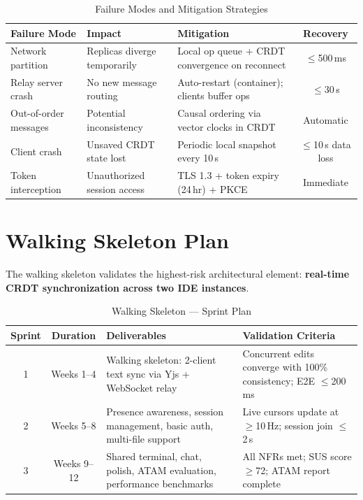 \documentclass[12pt, a4paper, oneside]{article}
\begin{document}
\begin{table}[H]
\centering
\caption{Failure Modes and Mitigation Strategies}
\begin{tabularx}{\textwidth}{l X X c}
\toprule
\textbf{Failure Mode} & \textbf{Impact} & \textbf{Mitigation} & \textbf{Recovery} \\
\midrule
Network partition & Replicas diverge temporarily & Local op queue + CRDT convergence on reconnect & $\leq$500\,ms \\
Relay server crash & No new message routing & Auto-restart (container); clients buffer ops & $\leq$30\,s \\
Out-of-order messages & Potential inconsistency & Causal ordering via vector clocks in CRDT & Automatic \\
Client crash & Unsaved CRDT state lost & Periodic local snapshot every 10\,s & $\leq$10\,s data loss \\
Token interception & Unauthorized session access & TLS 1.3 + token expiry (24\,hr) + PKCE & Immediate \\
\bottomrule
\end{tabularx}
\end{table}

\section{Walking Skeleton Plan}

The walking skeleton validates the highest-risk architectural element: \textbf{real-time CRDT synchronization across two IDE instances}.

\begin{table}[H]
\centering
\caption{Walking Skeleton --- Sprint Plan}
\begin{tabularx}{\textwidth}{c c X X}
\toprule
\textbf{Sprint} & \textbf{Duration} & \textbf{Deliverables} & \textbf{Validation Criteria} \\
\midrule
1 & Weeks 1--4 & Walking skeleton: 2-client text sync via Yjs + WebSocket relay & Concurrent edits converge with 100\% consistency; E2E $\leq$200\,ms \\
2 & Weeks 5--8 & Presence awareness, session management, basic auth, multi-file support & Live cursors update at $\geq$10\,Hz; session join $\leq$2\,s \\
3 & Weeks 9--12 & Shared terminal, chat, polish, ATAM evaluation, performance benchmarks & All NFRs met; SUS score $\geq$72; ATAM report complete \\
\bottomrule
\end{tabularx}
\end{table}
\end{document}

